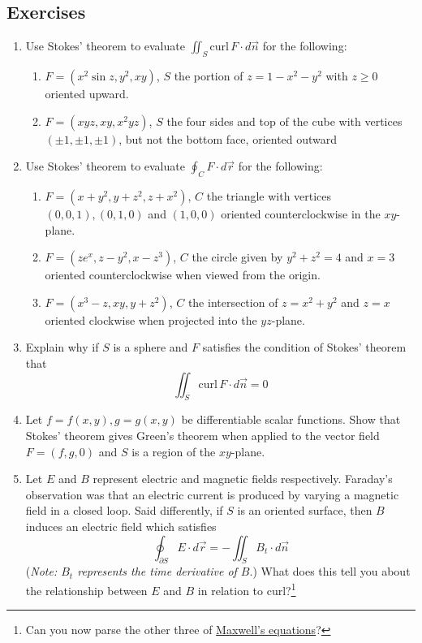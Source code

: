 \documentclass[12pt]{article}
\numberwithin{equation}{subsection}
\numberwithin{figure}{subsection}
\theoremstyle{note}
\newcommand{\curl}{\mathrm{curl\,}}
\begin{document}
{\subsection{Exercises}
\begin{enumerate}[label=\arabic*.]

\item Use Stokes' theorem to evaluate $\displaystyle \iint_{S} \curl F\cdot d\vec{n}$ for the following:

\begin{enumerate}
	\item $F=(x^2\sin z, y^2, xy)$, $S$ the portion of $z=1-x^2-y^2$ with $z\geq 0$ oriented upward. 
	\item $F=(xyz, xy, x^2yz)$, $S$ the four sides and top of the cube with vertices $(\pm 1, \pm 1, \pm 1)$, but not the bottom face, oriented outward
\end{enumerate}

\item Use Stokes' theorem to evaluate $\displaystyle \oint_C F\cdot d\vec{r}$ for the following:

\begin{enumerate}
	\item $F=(x+y^2, y+z^2, z+x^2)$, $C$ the triangle with vertices $(0,0,1), (0,1,0)$ and $(1,0,0)$ oriented counterclockwise in the $xy$-plane. 
	\item $F=(ze^x, z-y^2, x-z^3)$, $C$ the circle given by $y^2+z^2=4$ and $x=3$ oriented counterclockwise when viewed from the origin. 
	\item $F=(x^3-z, xy, y+z^2)$,  $C$ the intersection of $z=x^2+y^2$ and $z=x$ oriented clockwise when projected into the $yz$-plane. 

\end{enumerate}

\item Explain why if $S$ is a sphere and $F$ satisfies the condition of Stokes' theorem that \[\iint_{S} \curl F\cdot d\vec{n}=0\]
\item \label{stokes-greens} Let $f=f(x,y), g=g(x,y)$ be differentiable scalar functions. Show that Stokes' theorem gives Green's theorem when applied to the vector field $F=(f,g,0)$ and $S$ is a region of the $xy$-plane.

\item Let $E$ and $B$ represent electric and magnetic fields respectively. Faraday's observation was that an electric current is produced by varying a magnetic field in a closed loop. Said differently, if $S$ is an oriented surface, then $B$ induces an electric field which satisfies \[\oint_{\partial S} E\cdot d\vec{r}= -\iint_{S} B_t \cdot d\vec{n}\] (\textit{Note: $B_t$ represents the time derivative of $B$}.) What does this tell you about the relationship between $E$ and $B$ in relation to curl?\footnote{Can you now parse the other three of \href{https://en.wikipedia.org/wiki/Maxwell\%27s_equations\#Macroscopic_formulation 
}{Maxwell's equations}?}


\end{enumerate}}
\end{document}
